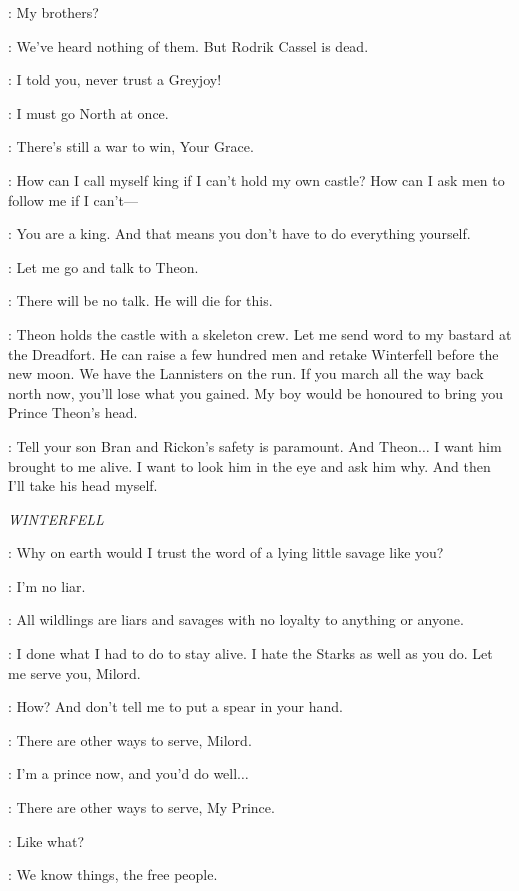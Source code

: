 \ROBB: My brothers? 

\ROOSE: We've heard nothing of them. But Rodrik Cassel is dead. 

\CATELYN: I told you, never trust a Greyjoy! 

\ROBB: I must go North at once. 

\ROOSE: There's still a war to win, Your Grace. 

\ROBB: How can I call myself king if I can't hold my own castle? How can I ask men to follow me if I can't---

\ROOSE: You are a king. And that means you don't have to do everything yourself. 

\CATELYN: Let me go and talk to Theon. 

\ROBB: There will be no talk. He will die for this. 

\ROOSE: Theon holds the castle with a skeleton crew. Let me send word to my bastard at the Dreadfort. He can raise a few hundred men and retake Winterfell before the new moon. We have the Lannisters on the run. If you march all the way back north now, you'll lose what you gained. My boy would be honoured to bring you Prince Theon's head. 

\ROBB: Tell your son Bran and Rickon's safety is paramount. And Theon$\ldots$ I want him brought to me alive. I want to look him in the eye and ask him why. And then I'll take his head myself. 


\scene

\textit{WINTERFELL} 


\THEON: Why on earth would I trust the word of a lying little savage like you? 

\OSHA: I'm no liar. 

\THEON: All wildlings are liars and savages with no loyalty to anything or anyone. 

\OSHA: I done what I had to do to stay alive. I hate the Starks as well as you do. Let me serve you, Milord. 

\THEON: How? And don't tell me to put a spear in your hand. 

\OSHA: There are other ways to serve, Milord. 

\THEON: I'm a prince now, and you'd do well$\ldots$ 

\OSHA: There are other ways to serve, My Prince. 

\THEON: Like what? 

\OSHA: We know things, the free people. 

